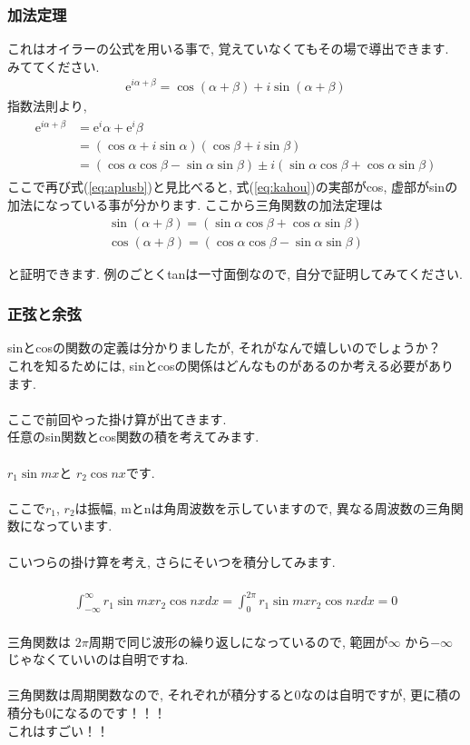 \documentclass[11pt,a4paper]{jsarticle}
\begin{document}
\subsubsection{加法定理}
これはオイラーの公式を用いる事で, 覚えていなくてもその場で導出できます. みててください.
\begin{eqnarray}
\mathrm{e}^{i{\alpha + \beta}} = \cos (\alpha + \beta) + i\sin (\alpha + \beta)
\label{eq:aplusb}
\end{eqnarray}
指数法則より,
\begin{eqnarray}
\begin{split}
\mathrm{e}^{i{\alpha + \beta}} &= \mathrm{e}^i\alpha + \mathrm{e}^i\beta \\ &= (\cos \alpha + i\sin\alpha)(\cos\beta + i\sin\beta) \\
&= (\cos\alpha\cos\beta - \sin\alpha\sin\beta)\pm i(\sin\alpha\cos\beta + \cos\alpha\sin\beta)
\end{split}
\label{eq:kahou}
\end{eqnarray}
ここで再び式(\ref{eq:aplusb})と見比べると, 式(\ref{eq:kahou})の実部がcos, 虚部がsinの加法になっている事が分かります. ここから三角関数の加法定理は
\begin{eqnarray}
\sin (\alpha + \beta) = (\sin\alpha\cos\beta + \cos\alpha\sin\beta)\\
\cos (\alpha + \beta) = (\cos\alpha\cos\beta - \sin\alpha\sin\beta)
\label{kahouteiri}
\end{eqnarray}

と証明できます. 例のごとくtanは一寸面倒なので, 自分で証明してみてください.
\subsubsection{正弦と余弦}
sinとcosの関数の定義は分かりましたが, それがなんで嬉しいのでしょうか？\\
これを知るためには, sinとcosの関係はどんなものがあるのか考える必要があります.\\
\\
ここで前回やった掛け算が出てきます. \\
任意のsin関数とcos関数の積を考えてみます.\\
\\
$r_1\sin mx $と $r_2\cos nx $です.\\
\\
ここで$r_1$, $r_2$は振幅, mとnは角周波数を示していますので, 異なる周波数の三角関数になっています.\\
\\
こいつらの掛け算を考え, さらにそいつを積分してみます.\\
\\
\begin{eqnarray}
  \int^\infty_{-\infty} r_1\sin mx r_2\cos nx dx = \int^{2\pi}_0 r_1\sin mx r_2\cos nx dx = 0
\end{eqnarray}
\\
三角関数は $2\pi$周期で同じ波形の繰り返しになっているので, 範囲が$\infty$ から$-\infty$じゃなくていいのは自明ですね.\\
\\
三角関数は周期関数なので, それぞれが積分すると0なのは自明ですが, 更に積の積分も0になるのです！！！\\
これはすごい！！\\
\end{document}
